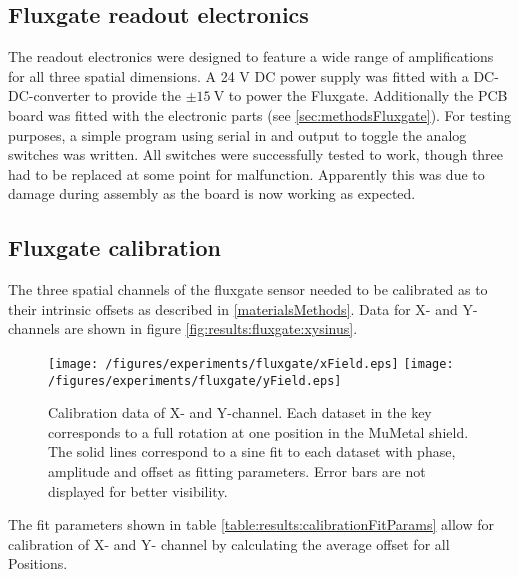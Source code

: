    \subsection{Fluxgate readout electronics}
        The readout electronics were designed to feature a wide range of amplifications for all three spatial dimensions. A 24 V DC power supply was fitted with a DC-DC-converter to provide the $\pm\SI{15}{\volt}$ to power the Fluxgate. Additionally the PCB board was fitted with the electronic parts (see \ref{sec:methodsFluxgate}). For testing purposes, a simple program using serial in and output to toggle the analog switches was written. All switches were successfully tested to work, though three had to be replaced at some point for malfunction.  Apparently this was due to damage during assembly as the board is now working as expected.
    \subsection{Fluxgate calibration}
        The three spatial channels of the fluxgate sensor needed to be calibrated as to their intrinsic offsets as described in \ref{materialsMethods}. Data for X- and Y-channels are shown in figure \ref{fig:results:fluxgate:xysinus}.
        \begin{figure}
            \label{fig:results:fluxgate:ysinus}
            \centering
            \texttt{[image: /figures/experiments/fluxgate/xField.eps]}
            \texttt{[image: /figures/experiments/fluxgate/yField.eps]}
            \caption[Calibration results X/Y]{Calibration data of X- and Y-channel. Each dataset in the key
            corresponds to a full rotation at one position in the MuMetal shield. The solid lines correspond to
            a sine fit to each dataset with phase, amplitude and offset as fitting parameters. Error bars are not
            displayed for better visibility.}
        \end{figure}
        The fit parameters shown in table \ref{table:results:calibrationFitParams} allow for calibration of X- and Y- channel by calculating the average offset for all Positions.
